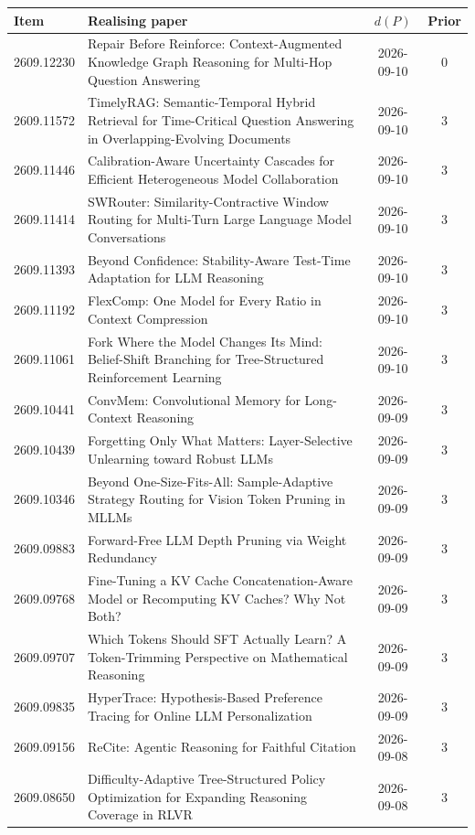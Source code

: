 \begin{longtable}{p{2.1cm}p{9.6cm}cc}\toprule
Item & Realising paper & $d(P)$ & Prior \\ \midrule\endhead
2609.12230 & Repair Before Reinforce: Context-Augmented Knowledge Graph Reasoning for Multi-Hop Question Answering & 2026-09-10 & 0 \\
2609.11572 & TimelyRAG: Semantic-Temporal Hybrid Retrieval for Time-Critical Question Answering in Overlapping-Evolving Documents & 2026-09-10 & 3 \\
2609.11446 & Calibration-Aware Uncertainty Cascades for Efficient Heterogeneous Model Collaboration & 2026-09-10 & 3 \\
2609.11414 & SWRouter: Similarity-Contractive Window Routing for Multi-Turn Large Language Model Conversations & 2026-09-10 & 3 \\
2609.11393 & Beyond Confidence: Stability-Aware Test-Time Adaptation for LLM Reasoning & 2026-09-10 & 3 \\
2609.11192 & FlexComp: One Model for Every Ratio in Context Compression & 2026-09-10 & 3 \\
2609.11061 & Fork Where the Model Changes Its Mind: Belief-Shift Branching for Tree-Structured Reinforcement Learning & 2026-09-10 & 3 \\
2609.10441 & ConvMem: Convolutional Memory for Long-Context Reasoning & 2026-09-09 & 3 \\
2609.10439 & Forgetting Only What Matters: Layer-Selective Unlearning toward Robust LLMs & 2026-09-09 & 3 \\
2609.10346 & Beyond One-Size-Fits-All: Sample-Adaptive Strategy Routing for Vision Token Pruning in MLLMs & 2026-09-09 & 3 \\
2609.09883 & Forward-Free LLM Depth Pruning via Weight Redundancy & 2026-09-09 & 3 \\
2609.09768 & Fine-Tuning a KV Cache Concatenation-Aware Model or Recomputing KV Caches? Why Not Both? & 2026-09-09 & 3 \\
2609.09707 & Which Tokens Should SFT Actually Learn? A Token-Trimming Perspective on Mathematical Reasoning & 2026-09-09 & 3 \\
2609.09835 & HyperTrace: Hypothesis-Based Preference Tracing for Online LLM Personalization & 2026-09-09 & 3 \\
2609.09156 & ReCite: Agentic Reasoning for Faithful Citation & 2026-09-08 & 3 \\
2609.08650 & Difficulty-Adaptive Tree-Structured Policy Optimization for Expanding Reasoning Coverage in RLVR & 2026-09-08 & 3 \\

\end{longtable}
